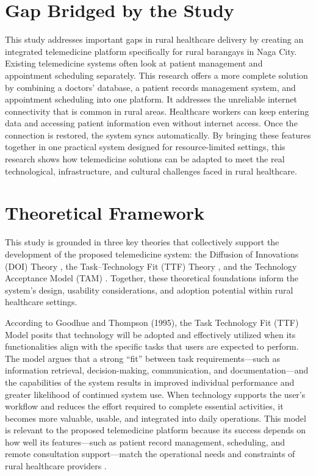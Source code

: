 \documentclass[12pt]{report}
\begin{document}
\section*{Gap Bridged by the Study}

This study addresses important gaps in rural healthcare delivery by creating an
integrated telemedicine platform specifically for rural barangays in Naga City.
Existing telemedicine systems often look at patient management and appointment
scheduling separately. This research offers a more complete solution by
combining a doctors' database, a patient records management system, and
appointment scheduling into one platform. It addresses the unreliable internet
connectivity that is common in rural areas. Healthcare workers can keep entering
data and accessing patient information even without internet access. Once the
connection is restored, the system syncs automatically. By bringing these
features together in one practical system designed for resource-limited
settings, this research shows how telemedicine solutions can be adapted to meet
the real technological, infrastructure, and cultural challenges faced in rural
healthcare.

\section*{Theoretical Framework}

This study is grounded in three key theories that collectively support the
development of the proposed telemedicine system: the Diffusion of Innovations
(DOI) Theory \cite{ref42}, the Task--Technology Fit (TTF) Theory \cite{ref52},
and the Technology Acceptance Model (TAM) \cite{ref58}. Together, these
theoretical foundations inform the system's design, usability considerations,
and adoption potential within rural healthcare settings.

According to Goodhue and Thompson (1995), the Task Technology Fit (TTF) Model
posits that technology will be adopted and effectively utilized when its
functionalities align with the specific tasks that users are expected to
perform. The model argues that a strong ``fit'' between task requirements---such
as information retrieval, decision-making, communication, and
documentation---and the capabilities of the system results in improved
individual performance and greater likelihood of continued system use. When
technology supports the user's workflow and reduces the effort required to
complete essential activities, it becomes more valuable, usable, and integrated
into daily operations. This model is relevant to the proposed telemedicine
platform because its success depends on how well its features---such as patient
record management, scheduling, and remote consultation support---match the
operational needs and constraints of rural healthcare providers \cite{ref52}.
\end{document}
